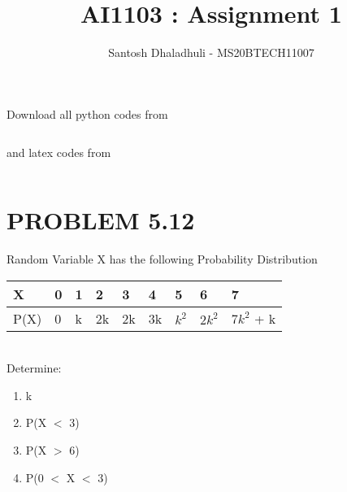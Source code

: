 \documentclass[journal,12pt,twocolumn]{IEEEtran}
\begin{document}
     \def\rightbox#1{\makebox[0in][r]{#1}}
     \def\centbox#1{\makebox[0in]{#1}}
     \def\topbox#1{\raisebox{-\baselineskip}[0in][0in]{#1}}
     \def\midbox#1{\raisebox{-0.5\baselineskip}[0in][0in]{#1}}
\vspace{3cm}
\title{AI1103 : Assignment 1}
\author{Santosh Dhaladhuli - MS20BTECH11007}
\maketitle
\newpage
\bigskip
\renewcommand{\thefigure}{\theenumi}
\renewcommand{\thetable}{\theenumi}
Download all python codes from 
\begin{lstlisting}

\end{lstlisting}
%
and latex codes from 
%
\begin{lstlisting}

\end{lstlisting}
\section*{PROBLEM 5.12}
Random Variable X has the following Probability Distribution \\
\begin{table}[h]
\begin{tabular}{|l|l|l|l|l|l|l|l|l|}

\hline
X    & 0 & 1 & 2  & 3  & 4  & 5   & 6  & 7                     \\ \hline    
P(X) & 0 & k & 2k & 2k & 3k & $k^2$ & $2k^2$ & $7k^2$ + k \\ 
\hline
\end{tabular}
\end{table} 
\\
Determine:
\begin{enumerate}
\item k 
\item P(X $<$ 3) 
\item P(X $>$ 6)  
\item P(0 $<$ X $<$ 3) 
\end{enumerate}
\end{document}
